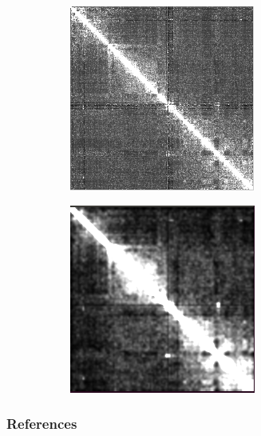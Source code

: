\documentclass{beamer}
\begin{document}
\begin{frame}
\begin{figure}[H]
\begin{subfigure}[b]{.25\textwidth}
            \caption{}
            \label{fig:scn+pearson}
        \end{subfigure}
        \begin{subfigure}[b]{.25\textwidth}
            \includegraphics[width=\textwidth]{figures/pearson+scn.png}
            \caption{}
            \label{fig:pearson+scn}
        \end{subfigure}
        \begin{subfigure}[b]{.25\textwidth}
            \includegraphics[width=\textwidth]{figures/pyr.png}
            \caption{}
            \label{fig:pyr}
        \end{subfigure}
        \caption*{}
        \label{fig:normalizations}
    \end{figure}
\end{frame}
\begin{frame}[allowframebreaks]
    \frametitle{References}
    
    
\end{frame}
\end{document}
